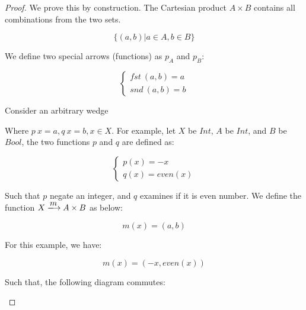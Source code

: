\documentclass[UTF8]{article}
\begin{document}
\begin{proof}
We prove this by construction. The Cartesian product $A \times B$ contains all combinations from the two sets.

\[
\{(a, b) | a \in A, b \in B\}
\]

We define two special arrows (functions) as $p_A$ and $p_B$:

\[
\begin{cases}
fst\ (a, b) = a \\
snd\ (a, b) = b
\end{cases}
\]

Consider an arbitrary wedge

\begin{center}
\end{center}

Where $p\ x = a, q\ x = b, x \in X$. For example, let $X$ be $Int$, $A$ be $Int$, and $B$ be $Bool$, the two functions $p$ and $q$ are defined as:

\[
\begin{cases}
p(x) = -x \\
q(x) = even(x)
\end{cases}
\]

Such that $p$ negate an integer, and $q$ examines if it is even number. We define the function $X \arrowto{m} A \times B$ as below:

\[
m(x) = (a, b)
\]

For this example, we have:

\[
m(x) = (-x, even(x))
\]

Such that, the following diagram commutes:

\begin{center}
\end{center}


\end{proof}
\end{document}
